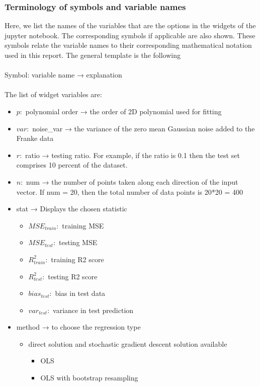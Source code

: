\subsubsection{Terminology of symbols and variable names}
Here, we list the names of the variables that are the options in the widgets of the jupyter notebook. The corresponding symbols if applicable are also shown. These symbols relate the variable names to their corresponding mathematical notation used in this report. The general template is the following \\
\\
Symbol: variable name → explanation \\
\\
The list of widget variables are:
\begin{itemize}
    \item $p:$  polynomial order → the order of 2D polynomial used for fitting
    \item $var:$  noise\_var → the variance of the zero mean Gaussian noise added to the Franke data
    \item $r:$  ratio → testing ratio. For example, if the ratio is 0.1 then the test set comprises 10 percent of the dataset.
    \item $n:$  num → the number of points taken along each direction of the input vector. If num = 20, then the total number of data points is 20*20 = 400
    \item stat → Displays the chosen statistic
    \begin{itemize}
        \item $MSE_{train}:$ training MSE
        \item $MSE_{test}:$ testing MSE
        \item ${R^2_{train}}:$ training R2 score
        \item ${R^2_{test}}:$ testing R2 score
        \item $bias_{test}:$ bias in test data
        \item $var_{test}:$ variance in test prediction
    \end{itemize}
    \item method → to choose the regression type
    \begin{itemize}
        \item direct solution and stochastic gradient descent solution available
        \begin{itemize}
            \item OLS
            \item OLS with bootstrap resampling

\end{itemize}
\end{itemize}
\end{itemize}
